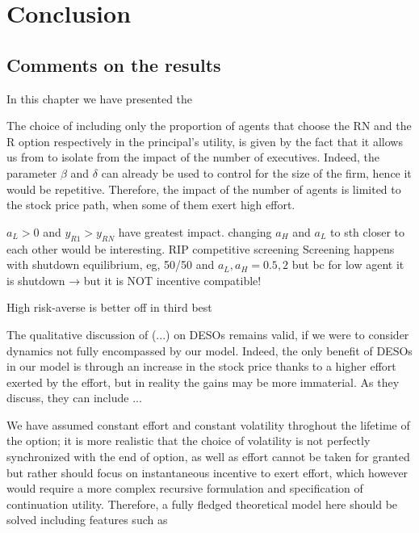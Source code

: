 \section{Conclusion}


\subsection*{Comments on the results}
In this chapter we have presented the 


The choice of including only the proportion of agents that choose the RN and the R option respectively in the principal's utility, is given by the fact that it allows us from to isolate from the impact of the number of executives. Indeed, the parameter $\beta$ and $\delta$ can already be used to control for the size of the firm, hence it would be repetitive. Therefore, the impact of the number of agents is limited to the stock price path, when some of them exert high effort.

$a_L> 0$ and $y_{R1} > y_{RN}$ have greatest impact. changing $a_H$ and $a_L$ to sth closer to each other would be interesting.
RIP competitive screening
    Screening happens with shutdown equilibrium, eg, 50/50 and $a_L, a_H = 0.5, 2$ but bc for low agent it is shutdown → but it is NOT incentive compatible!

    High risk-averse is better off in third best

The qualitative discussion of (...) on DESOs remains valid, if we were to consider dynamics not fully encompassed by our model. Indeed, the only benefit of DESOs in our model is through an increase in the stock price thanks to a higher effort exerted by the effort, but in reality the gains may be more immaterial. As they discuss, they can include ...

We have assumed constant effort and constant volatility throghout the lifetime of the option; it is more realistic that the choice of volatility is not perfectly synchronized with the end of option, as well as effort cannot be taken for granted but rather should focus on instantaneous incentive to exert effort, which however would require a more complex recursive formulation and specification of continuation utility. Therefore, a fully fledged theoretical model here should be solved including features such as 

